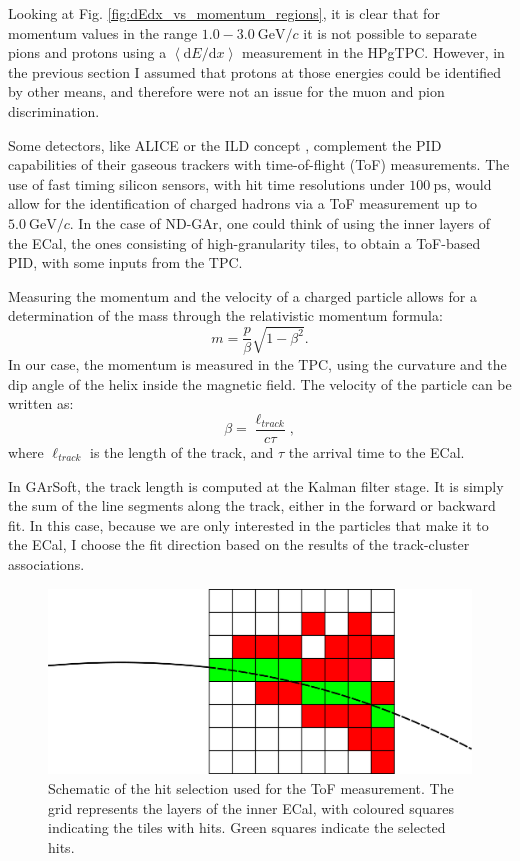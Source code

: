 Looking at Fig. \ref{fig:dEdx_vs_momentum_regions}, it is clear that for momentum values in the range $1.0-3.0 ~ \mathrm{GeV}/c$ it is not possible to separate pions and protons using a $\left<\mathrm{d}E/\mathrm{d}x\right>$ measurement in the HPgTPC. However, in the previous section I assumed that protons at those energies could be identified by other means, and therefore were not an issue for the muon and pion discrimination.

Some detectors, like ALICE \cite{ALICE2011} or the ILD concept \cite{Einhaus2021}, complement the PID capabilities of their gaseous trackers with time-of-flight (ToF) measurements. The use of fast timing silicon sensors, with hit time resolutions under $100~\mathrm{ps}$, would allow for the identification of charged hadrons via a ToF measurement up to $5.0 ~ \mathrm{GeV}/c$. In the case of ND-GAr, one could think of using the inner layers of the ECal, the ones consisting of high-granularity tiles, to obtain a ToF-based PID, with some inputs from the TPC.

Measuring the momentum and the velocity of a charged particle allows for a determination of the mass through the relativistic momentum formula:
\begin{equation}\label{8.19}
	m = \frac{p}{\beta} \sqrt{1-\beta^{2}}.
\end{equation}
In our case, the momentum is measured in the TPC, using the curvature and the dip angle of the helix inside the magnetic field. The velocity of the particle can be written as:
\begin{equation}
	\beta = \frac{\ell_{track}}{c \tau},
\end{equation}
where $\ell_{track}$ is the length of the track, and $\tau$ the arrival time to the ECal.

In GArSoft, the track length is computed at the Kalman filter stage. It is simply the sum of the line segments along the track, either in the forward or backward fit. In this case, because we are only interested in the particles that make it to the ECal, I choose the fit direction based on the results of the track-cluster associations.

\begin{figure}[t]
	\centering
	\includegraphics[width=.75\linewidth]{Images/GArSoft_PID/tof/tof_diagram.png}
	\caption[Schematic diagram of the hit selection used for the ECal ToF measurement.]{Schematic of the hit selection used for the ToF measurement. The grid represents the layers of the inner ECal, with coloured squares indicating the tiles with hits. Green squares indicate the selected hits.}
	\label{fig:tof_diagram}
\end{figure}

